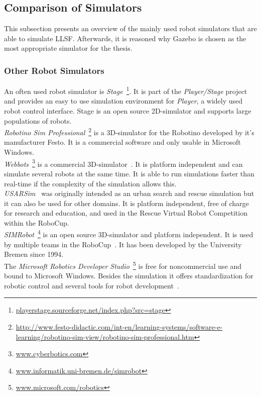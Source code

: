 \documentclass[11pt,a4paper,titlepage]{article}
\begin{document}
\subsection{Comparison of Simulators}
This subsection presents an overview of the mainly used robot simulators that are able to simulate LLSF. Afterwards, it is reasoned why Gazebo is chosen as the most appropriate simulator for the thesis.
\subsubsection{Other Robot Simulators}
An often used robot simulator is \textit{Stage}~\footnote{\url{playerstage.sourceforge.net/index.php?src=stage}}. It is part of the \textit{Player/Stage} project~\cite{PlayerStage} and provides an easy to use simulation environment for \textit{Player}, a widely used robot control interface. Stage is an open source 2D-simulator and supports large populations of robots.\\
\textit{Robotino Sim Professional}~\footnote{\url{http://www.festo-didactic.com/int-en/learning-systems/software-e-learning/robotino-sim-view/robotino-sim-professional.htm}} is a 3D-simulator for the Robotino developed by it's manufacturer Festo. It is a commercial software and only usable in Microsoft Windows.\\
\textit{Webbots}~\footnote{\url{www.cyberbotics.com}} is a commercial 3D-simulator~\cite{Webbots}. It is platform independent and can simulate several robots at the same time. It is able to run simulations faster than real-time if the complexity of the simulation allows this.\\
\textit{USARSim}~\cite{USARSim} was originally intended as an urban search and rescue simulation but it can also be used for other domains. It is platform independent, free of charge for research and education, and used in the Rescue Virtual Robot Competition within the RoboCup.\\
\textit{SIMRobot}~\footnote{\url{www.informatik.uni-bremen.de/simrobot}} is an open source 3D-simulator and platform independent. It is used by multiple teams in the RoboCup~\cite{SIMRobot}. It has been developed by the University Bremen since 1994.\\
The \textit{Microsoft Robotics Developer Studio}~\footnote{\url{www.microsoft.com/robotics}} is free for noncommercial use and bound to Microsoft Windows. Besides the simulation it offers standardization for robotic control and several tools for robot development~\cite{MicrosoftRoboticsStudio}.
\end{document}
